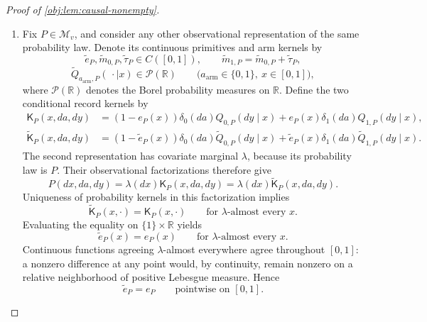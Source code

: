 \documentclass[11pt]{article}
\begin{document}
\begin{proof}[Proof of \cref{obj:lem:causal-nonempty}]
\begin{enumerate}
\item Fix \(P\in\mathcal M_v\), and consider any other observational representation of the same probability law. Denote its continuous primitives and arm kernels by
\[
\widetilde e_P,\widetilde m_{0,P},\widetilde\tau_P\in C([0,1]),
\qquad
\widetilde m_{1,P}
=\widetilde m_{0,P}+\widetilde\tau_P,
\]
\[
\widetilde Q_{a_{\mathrm{arm}},P}(\,\cdot\mid x)
\in\mathcal P(\mathbb R)
\qquad
\bigl(a_{\mathrm{arm}}\in\{0,1\},\ x\in[0,1]\bigr),
\]
where \(\mathcal P(\mathbb R)\) denotes the Borel probability measures on \(\mathbb R\).
Define the two conditional record kernels by
\[
\begin{aligned}
\mathsf K_P(x,da,dy)
&=(1-e_P(x))\delta_0(da)Q_{0,P}(dy\mid x)
  +e_P(x)\delta_1(da)Q_{1,P}(dy\mid x),\\
\widetilde{\mathsf K}_P(x,da,dy)
&=(1-\widetilde e_P(x))\delta_0(da)\widetilde Q_{0,P}(dy\mid x)
  +\widetilde e_P(x)\delta_1(da)\widetilde Q_{1,P}(dy\mid x).
\end{aligned}
\]
The second representation has covariate marginal \(\lambda\), because its probability law is \(P\). Their observational factorizations therefore give
\[
P(dx,da,dy)
=\lambda(dx)\mathsf K_P(x,da,dy)
=\lambda(dx)\widetilde{\mathsf K}_P(x,da,dy).
\]
Uniqueness of probability kernels in this factorization implies
\[
\widetilde{\mathsf K}_P(x,\cdot)
=\mathsf K_P(x,\cdot)
\qquad\text{for \(\lambda\)-almost every }x.
\]
Evaluating the equality on \(\{1\}\times\mathbb R\) yields
\[
\widetilde e_P(x)=e_P(x)
\qquad\text{for \(\lambda\)-almost every }x.
\]
Continuous functions agreeing \(\lambda\)-almost everywhere agree throughout \([0,1]\): a nonzero difference at any point would, by continuity, remain nonzero on a relative neighborhood of positive Lebesgue measure. Hence
\[
\widetilde e_P=e_P
\qquad\text{pointwise on }[0,1].
\]


\end{enumerate}
\end{proof}
\end{document}
